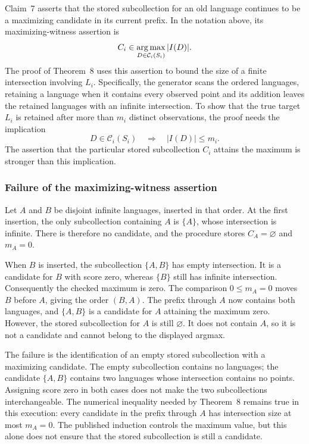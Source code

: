 Claim~7 asserts that the stored subcollection for an old language
continues to be a maximizing candidate in its current prefix. In the
notation above, its maximizing-witness assertion is
\[
 C_i\in\mathop{\rm arg\,max}_{D\in\mathcal C_i(S_i)} |I(D)|.
\]
The proof of Theorem~8 uses this assertion to bound the size of a finite
intersection involving $L_i$. Specifically, the generator scans the
ordered languages, retaining a language when it contains every observed
point and its addition leaves the retained languages with an infinite
intersection. To show that the true target $L_i$ is retained after more
than $m_i$ distinct observations, the proof needs the implication
\[
 D\in\mathcal C_i(S_i)\quad\Longrightarrow\quad |I(D)|\le m_i.
\]
The assertion that the particular stored subcollection $C_i$ attains
the maximum is stronger than this implication.

\subsubsection{Failure of the maximizing-witness assertion}

Let $A$ and $B$ be disjoint infinite languages, inserted in that order.
At the first insertion, the only subcollection containing $A$ is
$\{A\}$, whose intersection is infinite. There is therefore no
candidate, and the procedure stores $C_A=\varnothing$ and $m_A=0$.

When $B$ is inserted, the subcollection $\{A,B\}$ has empty
intersection. It is a candidate for $B$ with score zero, whereas
$\{B\}$ still has infinite intersection. Consequently the checked
maximum is zero. The comparison $0\le m_A=0$ moves $B$ before $A$,
giving the order $(B,A)$. The prefix through $A$ now contains both
languages, and $\{A,B\}$ is a candidate for $A$ attaining the
maximum zero. However, the stored subcollection for $A$ is still
$\varnothing$. It does not contain $A$, so it is not a candidate and
cannot belong to the displayed argmax.

The failure is the identification of an empty stored subcollection
with a maximizing candidate. The empty subcollection contains no
languages; the candidate $\{A,B\}$ contains two languages whose
intersection contains no points. Assigning score zero in both cases
does not make the two subcollections interchangeable. The numerical
inequality needed by Theorem~8 remains true in this execution: every
candidate in the prefix through $A$ has intersection size at most
$m_A=0$.
The published induction controls the maximum value, but this alone
does not ensure that the stored subcollection is still a candidate.

